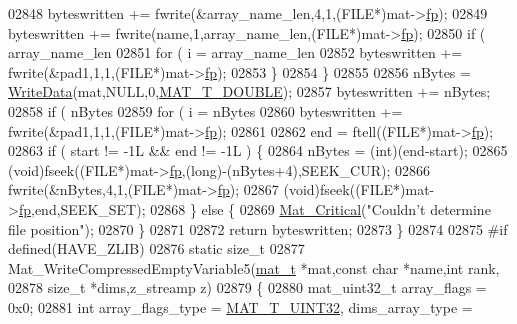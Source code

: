 \begin{DoxyCode}
{{{{{{{{{{{{{{{{02848             byteswritten += fwrite(&array\_name\_len,4,1,(FILE*)mat->\hyperlink{struct__mat__t_a85f562e407ca9ad4d2a6e14f839432b7}{fp});
02849             byteswritten += fwrite(name,1,array\_name\_len,(FILE*)mat->\hyperlink{struct__mat__t_a85f562e407ca9ad4d2a6e14f839432b7}{fp});
02850             \textcolor{keywordflow}{if} ( array\_name\_len %
02851                 \textcolor{keywordflow}{for} ( i = array\_name\_len %
02852                     byteswritten += fwrite(&pad1,1,1,(FILE*)mat->\hyperlink{struct__mat__t_a85f562e407ca9ad4d2a6e14f839432b7}{fp});
02853         \}
02854     \}
02855 
02856     nBytes = \hyperlink{mat5_8c_a1bec2ccf2a3b48706edd32e63744d364}{WriteData}(mat,NULL,0,\hyperlink{group___m_a_t_ggacf7b3b879282b7ab3a51190e49bf3453a31e721ecf7e188196f83c32838288797}{MAT\_T\_DOUBLE});
02857     byteswritten += nBytes;
02858     \textcolor{keywordflow}{if} ( nBytes %
02859         \textcolor{keywordflow}{for} ( i = nBytes %
02860             byteswritten += fwrite(&pad1,1,1,(FILE*)mat->\hyperlink{struct__mat__t_a85f562e407ca9ad4d2a6e14f839432b7}{fp});
02861 
02862     end = ftell((FILE*)mat->\hyperlink{struct__mat__t_a85f562e407ca9ad4d2a6e14f839432b7}{fp});
02863     \textcolor{keywordflow}{if} ( start != -1L && end != -1L ) \{
02864         nBytes = (int)(end-start);
02865         (void)fseek((FILE*)mat->\hyperlink{struct__mat__t_a85f562e407ca9ad4d2a6e14f839432b7}{fp},(long)-(nBytes+4),SEEK\_CUR);
02866         fwrite(&nBytes,4,1,(FILE*)mat->\hyperlink{struct__mat__t_a85f562e407ca9ad4d2a6e14f839432b7}{fp});
02867         (void)fseek((FILE*)mat->\hyperlink{struct__mat__t_a85f562e407ca9ad4d2a6e14f839432b7}{fp},end,SEEK\_SET);
02868     \} \textcolor{keywordflow}{else} \{
02869         \hyperlink{group__mat__util_gaf51f2bfbb5580f575e4dd79757e2b80c}{Mat\_Critical}(\textcolor{stringliteral}{"Couldn't determine file position"});
02870     \}
02871 
02872     \textcolor{keywordflow}{return} byteswritten;
02873 \}
02874 
02875 \textcolor{preprocessor}{#if defined(HAVE\_ZLIB)}
02876 \textcolor{keyword}{static} \textcolor{keywordtype}{size\_t}
02877 Mat\_WriteCompressedEmptyVariable5(\hyperlink{struct__mat__t}{mat\_t} *mat,\textcolor{keyword}{const} \textcolor{keywordtype}{char} *name,\textcolor{keywordtype}{int} rank,
02878                                   \textcolor{keywordtype}{size\_t} *dims,z\_streamp z)
02879 \{
02880     mat\_uint32\_t array\_flags = 0x0;
02881     \textcolor{keywordtype}{int} array\_flags\_type = \hyperlink{group___m_a_t_ggacf7b3b879282b7ab3a51190e49bf3453aa397e285a23fe240368b752897652c6a}{MAT\_T\_UINT32}, dims\_array\_type = 
}}}}}}}}}}}}}}}}
\end{DoxyCode}

